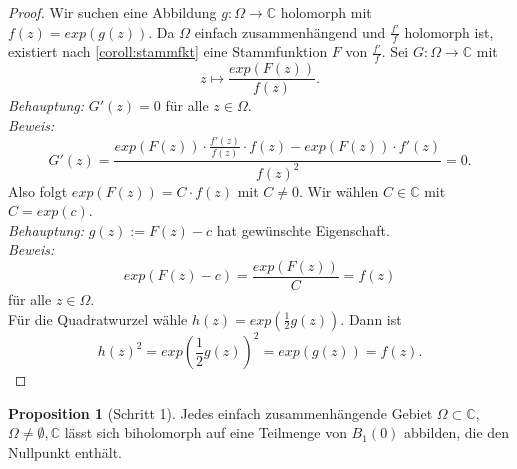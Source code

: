 \documentclass[11pt,titlepage]{article}
\theoremstyle{definition}
\newtheorem{proposition}[theorem]{Proposition}
\theoremstyle{remark}
\begin{document}
	\begin{proof}
		Wir suchen eine Abbildung $g:\Omega\to\mathbb{C}$ holomorph mit $f(z)=exp(g(z))$. Da 
		$\Omega$ einfach zusammenhängend und $\frac{f'}{f}$ holomorph ist, existiert nach 
		\ref{coroll:stammfkt} eine Stammfunktion $F$ von $\frac{f'}{f}$. 
		Sei $G:\Omega\to\mathbb{C}$ mit
		\[ z\mapsto \frac{exp(F(z))}{f(z)}. \]
		\textsl{Behauptung:} $G'(z)=0$ für alle $z\in\Omega$. \\
		\textsl{Beweis:}
		\[ G'(z)=\frac{exp(F(z))\cdot \frac{f'(z)}{f(z)}\cdot f(z) -exp(F(z))\cdot f'(z)}{f(z)^2}=0. \]
		Also folgt $exp(F(z))=C\cdot f(z)$ mit $C\neq 0$. Wir wählen $C\in \mathbb{C}$ mit $C=exp(c)$. \\
		\textsl{Behauptung:} $g(z):=F(z)-c$ hat gewünschte Eigenschaft. \\
		\textsl{Beweis:}
		\[ exp(F(z)-c)=\frac{exp(F(z))}{C}=f(z) \]
		für alle $z\in\Omega$. \\
		Für die Quadratwurzel wähle $h(z)=exp(\frac{1}{2}g(z))$. Dann ist
		\[ h(z)^2 =exp\left(\frac{1}{2}g(z)\right)^2 =exp(g(z))=f(z). \]
	\end{proof}
	
	\begin{proposition}[Schritt 1] \label{prop:schritt1}
		Jedes einfach zusammenhängende Gebiet $\Omega\subset\mathbb{C}$, $\Omega\neq\emptyset,\mathbb{C}$ 
		lässt sich biholomorph auf 
		eine Teilmenge von $B_1(0)$ abbilden, die den Nullpunkt enthält.
	\end{proposition}
	
\end{document}
